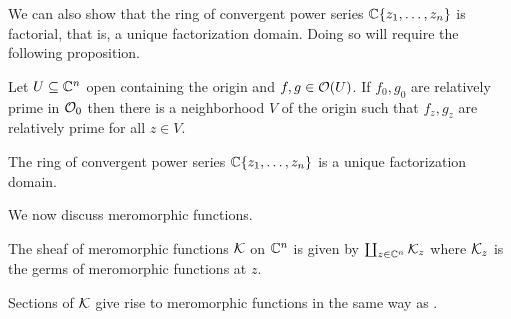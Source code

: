 We can also show that the ring of convergent power series $\mathbb{C}\{z_{1},\dots,z_{n}\}$ is factorial, that is, a unique factorization domain. Doing so will require the following proposition. 
\begin{proposition}\label{prop: relatively prime germs}
    Let $U\subseteq\mathbb{C}^{n}$ open containing the origin and $f,g\in\mathcal{O}(U)$. If $f_{0},g_{0}$ are relatively prime in $\mathcal{O}_{0}$ then there is a neighborhood $V$ of the origin such that $f_{z},g_{z}$ are relatively prime for all $z\in V$. 
\end{proposition}
\begin{theorem}\label{thm: convergent power series is UFD}
    The ring of convergent power series $\mathbb{C}\{z_{1},\dots,z_{n}\}$ is a unique factorization domain. 
\end{theorem}
We now discuss meromorphic functions. 
\begin{definition}\label{def: sheaf of meromorphic functions}
    The sheaf of meromorphic functions $\mathcal{K}$ on $\mathbb{C}^{n}$ is given by $\coprod_{z\in\mathbb{C}^{n}}\mathcal{K}_{z}$ where $\mathcal{K}_{z}$ is the germs of meromorphic functions at $z$. 
\end{definition}
Sections of $\mathcal{K}$ give rise to meromorphic functions in the same way as . 